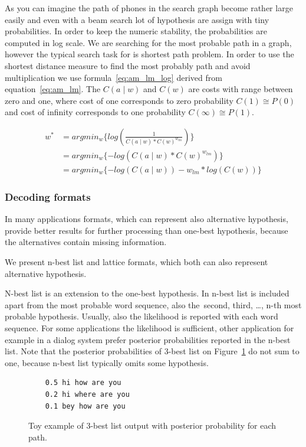 {As you can imagine the path of phones in the search graph 
become rather large easily and even with a beam search lot of hypothesis
are assign with tiny probabilities.
In order to keep the numeric stability, the probabilities 
are computed in log scale. We are searching for the most probable path in a graph,
however the typical search task for is shortest path problem.
In order to use the shortest distance measure to find the most probably path
and avoid multiplication we use formula~\ref{eq:am_lm_log} derived from equation~\ref{eq:am_lm}.
The $C(a \mid w)$ and $C(w)$ are costs with range between zero and one,
where cost of one corresponds to zero probability $C(1) \cong P(0)$ 
and cost of infinity corresponds to one probability $C(\infty) \cong P(1)$.

\begin{equation}\label{eq:am_lm}
    \begin{split}
        w^* &= argmin_{w}\{log(\frac{1}{C(a \mid w) * C(w)^{w_{lm}}})\} \\
        &= argmin_{w}\{-log(C(a \mid w) * C(w)^{w_{lm}})\} \\
        &= argmin_{w}\{-log(C(a \mid w)) - w_{lm}*log( C(w))\} 
    \end{split}
\end{equation}

\subsubsection*{Decoding formats}
In many applications formats, which can represent also alternative hypothesis,
provide better results for further processing than one-best hypothesis,
because the alternatives contain missing information.

We present n-best list and lattice formats, which both can also represent 
alternative hypothesis.

N-best list is an extension to the one-best hypothesis. 
In n-best list is included apart from the most probable word sequence, also 
the~second, third, \ldots, n-th most probable hypothesis. 
Usually, also the likelihood is reported with each word sequence.
For some applications the likelihood is sufficient,
other application for example in a dialog system prefer
posterior probabilities reported in the n-best list.
Note that the posterior probabilities of 3-best list on Figure~\ref{fig:nbest}
do not sum to one, because n-best list typically omits some hypothesis.

\begin{figure}[!htp]
    \begin{center}
\begin{verbatim}
    0.5 hi how are you
    0.2 hi where are you
    0.1 bey how are you
\end{verbatim}
    \caption{Toy example of 3-best list output with posterior probability for each path.}
    \label{fig:nbest} 
    \end{center}
\end{figure}

}
